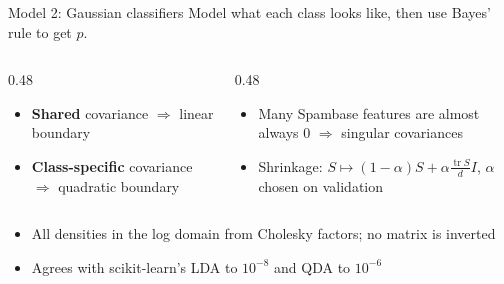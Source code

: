 \documentclass[aspectratio=169,11pt]{beamer}
\newcommand{\thepresenter}{}
\newcommand{\presenter}[1]{\renewcommand{\thepresenter}{#1}}
\newcommand{\key}[1]{\textcolor{accent}{\textbf{#1}}}
\begin{document}
\presenter{Tanishk Milind Tasgaonkar}
\begin{frame}{Model 2: Gaussian classifiers}
Model what each class looks like, then use Bayes' rule to get $p$.
\begin{columns}[T]
\begin{column}{0.48\textwidth}
\begin{itemize}
  \item \key{Shared} covariance $\Rightarrow$ linear boundary
  \item \key{Class-specific} covariance $\Rightarrow$ quadratic boundary
\end{itemize}
\end{column}
\begin{column}{0.48\textwidth}
\begin{itemize}
  \item Many Spambase features are almost always 0 $\Rightarrow$ singular covariances
  \item Shrinkage: $S\mapsto(1-\alpha)S+\alpha\frac{\operatorname{tr}S}{d}I$, $\alpha$ chosen on validation
\end{itemize}
\end{column}
\end{columns}
\vspace{0.8em}
\begin{itemize}
  \item All densities in the log domain from Cholesky factors; no matrix is inverted
  \item Agrees with scikit-learn's LDA to $10^{-8}$ and QDA to $10^{-6}$
\end{itemize}
\end{frame}
\end{document}
